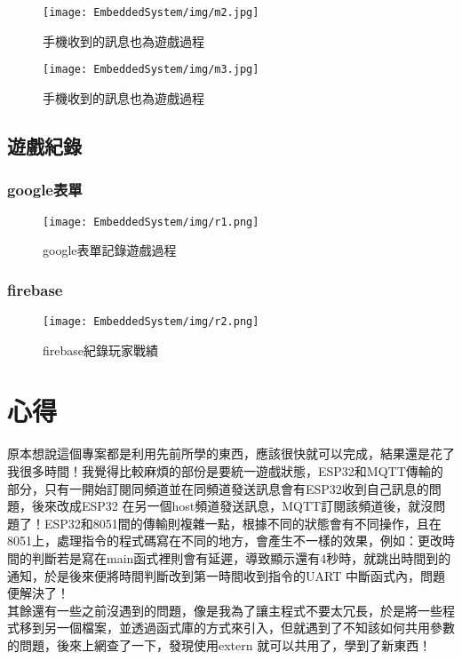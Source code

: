 \documentclass{scrartcl}
\begin{document}
\FloatBarrier
\begin{figure}[h]
  \centering
  \texttt{[image: EmbeddedSystem/img/m2.jpg]}
  \caption{手機收到的訊息也為遊戲過程}
  \label{fig16}
\end{figure}

\FloatBarrier
\begin{figure}[h]
  \centering
  \texttt{[image: EmbeddedSystem/img/m3.jpg]}
  \caption{手機收到的訊息也為遊戲過程}
  \label{fig17}
\end{figure}

\FloatBarrier
\subsection{遊戲紀錄}
\subsubsection{google表單}
\begin{figure}[h]
  \centering
  \texttt{[image: EmbeddedSystem/img/r1.png]}
  \caption{google表單記錄遊戲過程}
  \label{fig1}
\end{figure}

\FloatBarrier
\newpage
\subsubsection{firebase}
\begin{figure}[h]
  \centering
  \texttt{[image: EmbeddedSystem/img/r2.png]}
  \caption{firebase紀錄玩家戰績}
  \label{fig1}
\end{figure}

\FloatBarrier
\section{心得}
原本想說這個專案都是利用先前所學的東西，應該很快就可以完成，結果還是花了我很多時間！我覺得比較麻煩的部份是要統一遊戲狀態，ESP32和MQTT傳輸的部分，只有一開始訂閱同頻道並在同頻道發送訊息會有ESP32收到自己訊息的問題，後來改成ESP32 在另一個host頻道發送訊息，MQTT訂閱該頻道後，就沒問題了！ESP32和8051間的傳輸則複雜一點，根據不同的狀態會有不同操作，且在8051上，處理指令的程式碼寫在不同的地方，會產生不一樣的效果，例如：更改時間的判斷若是寫在main函式裡則會有延遲，導致顯示還有4秒時，就跳出時間到的通知，於是後來便將時間判斷改到第一時間收到指令的UART 中斷函式內，問題便解決了！\\

其餘還有一些之前沒遇到的問題，像是我為了讓主程式不要太冗長，於是將一些程式移到另一個檔案，並透過函式庫的方式來引入，但就遇到了不知該如何共用參數的問題，後來上網查了一下，發現使用extern 就可以共用了，學到了新東西！\\
\end{document}
